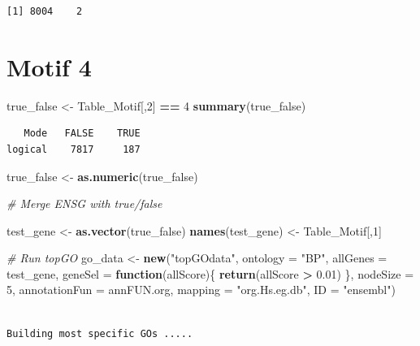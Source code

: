 \documentclass[]{article}
\newenvironment{Shaded}{\begin{snugshade}}{\end{snugshade}}
\newcommand{\KeywordTok}[1]{\textcolor[rgb]{0.13,0.29,0.53}{\textbf{#1}}}
\newcommand{\DataTypeTok}[1]{\textcolor[rgb]{0.13,0.29,0.53}{#1}}
\newcommand{\DecValTok}[1]{\textcolor[rgb]{0.00,0.00,0.81}{#1}}
\newcommand{\FloatTok}[1]{\textcolor[rgb]{0.00,0.00,0.81}{#1}}
\newcommand{\StringTok}[1]{\textcolor[rgb]{0.31,0.60,0.02}{#1}}
\newcommand{\CommentTok}[1]{\textcolor[rgb]{0.56,0.35,0.01}{\textit{#1}}}
\newcommand{\ControlFlowTok}[1]{\textcolor[rgb]{0.13,0.29,0.53}{\textbf{#1}}}
\newcommand{\OperatorTok}[1]{\textcolor[rgb]{0.81,0.36,0.00}{\textbf{#1}}}
\newcommand{\NormalTok}[1]{#1}
\begin{document}
\begin{verbatim}
[1] 8004    2
\end{verbatim}

\section{Motif 4}\label{motif-4}

\begin{Shaded}
\begin{Highlighting}[]
\NormalTok{true_false <-}\StringTok{ }\NormalTok{Table_Motif[,}\DecValTok{2}\NormalTok{] }\OperatorTok{==}\StringTok{ }\DecValTok{4}
\KeywordTok{summary}\NormalTok{(true_false)}
\end{Highlighting}
\end{Shaded}

\begin{verbatim}
   Mode   FALSE    TRUE 
logical    7817     187 
\end{verbatim}

\begin{Shaded}
\begin{Highlighting}[]
\NormalTok{true_false <-}\StringTok{ }\KeywordTok{as.numeric}\NormalTok{(true_false)}

\CommentTok{# Merge ENSG with true/false}

\NormalTok{test_gene <-}\StringTok{ }\KeywordTok{as.vector}\NormalTok{(true_false)}
\KeywordTok{names}\NormalTok{(test_gene) <-}\StringTok{ }\NormalTok{Table_Motif[,}\DecValTok{1}\NormalTok{]}

\CommentTok{# Run topGO}
\NormalTok{go_data <-}\StringTok{ }\KeywordTok{new}\NormalTok{(}\StringTok{"topGOdata"}\NormalTok{,}
                   \DataTypeTok{ontology =} \StringTok{"BP"}\NormalTok{,}
                   \DataTypeTok{allGenes =}\NormalTok{ test_gene, }
                    \DataTypeTok{geneSel =} \ControlFlowTok{function}\NormalTok{(allScore)\{}
    \KeywordTok{return}\NormalTok{(allScore }\OperatorTok{>}\StringTok{ }\FloatTok{0.01}\NormalTok{)}
\NormalTok{\},}
                   \DataTypeTok{nodeSize =} \DecValTok{5}\NormalTok{,}
                   \DataTypeTok{annotationFun =}\NormalTok{ annFUN.org,}
                   \DataTypeTok{mapping =} \StringTok{"org.Hs.eg.db"}\NormalTok{,}
                   \DataTypeTok{ID =} \StringTok{"ensembl"}\NormalTok{)}
\end{Highlighting}
\end{Shaded}

\begin{verbatim}

Building most specific GOs .....
\end{verbatim}
\end{document}
